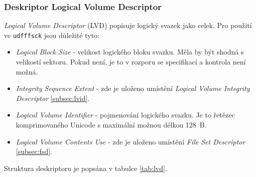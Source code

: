 \subsubsection{Deskriptor Logical Volume Descriptor}
\label{subsec:lvd}
\textit{Logical Volume Descriptor} (LVD) popisuje logický svazek jako celek. Pro použití ve \texttt{udfffsck} jsou důležité tyto:
\begin{itemize}
    \item \textit{Logical Block Size} - velikost logického bloku svazku. Měla by být shodná s velikostí sektoru. Pokud není, je to v rozporu se specifikací a kontrola není možná.
    \item \textit{Integrity Sequence Extent} - zde je uloženo umístění \textit{Logical Volume Integrity Descriptor} \ref{subsec:lvid}.
    \item \textit{Logical Volume Identifier} - pojmenování logického svazku. Je to řetězec komprimovaného Unicode s maximální možnou délkou 128~B.
    \item \textit{Logical Volume Contents Use} - zde je uloženo umístění \textit{File Set Descriptor} \ref{subsec:fsd}.
\end{itemize}
Struktura deskriptoru je popsána v tabulce \ref{tab:lvd}.
